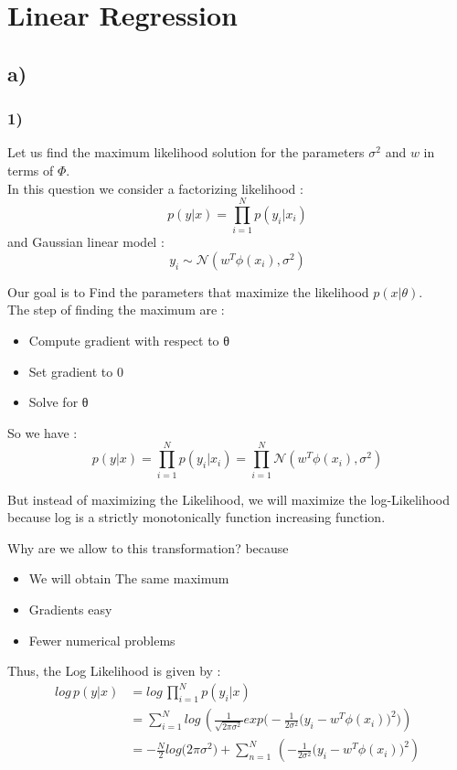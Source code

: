 \documentclass[12pt,twoside]{article}
\begin{document}
\section{Linear Regression}
\subsection*{a) }
\subsubsection*{1)}
Let us find the maximum likelihood solution for the parameters $\sigma^2$ and $w$ in terms of $\Phi$.\\
In this question we consider a factorizing likelihood :
\begin{equation*}
p(y|x) = \prod_{i=1}^{N} p(y_i|x_i)
\end{equation*}
and Gaussian linear model :
\begin{equation*}
y_i  \sim \mathcal{N}(w^T \phi(x_i), \sigma^2)
\end{equation*}

Our goal is to Find the parameters that maximize the likelihood $p(x| \theta)$.\\
The step of finding the maximum are :
\begin{itemize}
	\item  Compute gradient with respect to θ
	\item  Set gradient to 0
	\item  Solve for θ
\end{itemize}

So we have :
\begin{equation*}
p(y| x) = \prod_{i=1}^{N} p(y_i| x_i) = \prod_{i=1}^{N} \mathcal{N}(w^T \phi(x_i), \sigma^2)
\end{equation*}

But instead of maximizing the Likelihood, we will maximize the log-Likelihood because log is a strictly monotonically function increasing function.

Why are we allow to this transformation? because
\begin{itemize}
	\item  We will obtain The same maximum
	\item  Gradients easy
	\item  Fewer numerical problems
\end{itemize}

Thus, the Log Likelihood is given by :
\begin{align*}
log \,p(y| x) &= log \, \prod_{i=1}^{N} p(y_i| x) \\
&= \sum_{i=1}^{N} log \, \left( \frac{1}{\sqrt{2 \pi \sigma^2}} exp\big(-\frac{1}{2 \sigma^2}\big(y_i - w^T \phi(x_i)\big)^2\big) \right) \\
&= -\frac{N}{2} log\big(2 \pi \sigma^2\big) + \sum_{n=1}^{N}  \, \left( -\frac{1}{2 \sigma^2}\big(y_i - w^T \phi(x_i)\big)^2 \right) \\
\end{align*}
\end{document}
